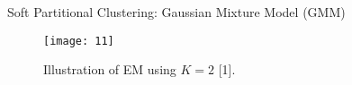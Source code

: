 \documentclass[compress,oilve]{beamer}
\begin{document}
\begin{frame}{Soft Partitional Clustering: Gaussian Mixture Model (GMM)}
\begin{figure}
	\centering
	\texttt{[image: 11]}
	\caption{Illustration of EM using $K = 2$ [1].}
\end{figure}
\end{frame}





\end{document}
